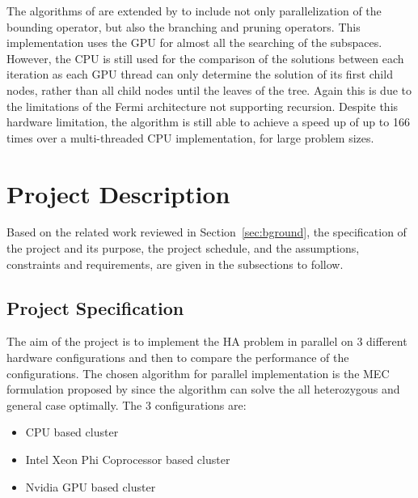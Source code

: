 \documentclass[10pt,twocolumn]{article}
\begin{document}
The algorithms of \cite{melab:2012, chakroun:2012} are extended by \cite{chakroun:2013} to 
include not only parallelization of the bounding operator, but also the branching and pruning operators. This
implementation uses the GPU for almost all the searching of the subspaces. However, the CPU is still used for the
comparison of the solutions between each iteration as each GPU thread can only determine the solution of its 
first child nodes, rather than all child nodes until the leaves of the tree. Again this is due to the limitations 
of the Fermi architecture not supporting recursion. Despite this hardware limitation, the algorithm is still able
to achieve a speed up of up to 166 times over a multi-threaded CPU implementation, for large problem sizes.


\section{Project Description} \label{sec:projdes}

Based on the related work reviewed in Section~\ref{sec:bground}, the specification of the project and its 
purpose, the project schedule, and the assumptions, constraints and requirements, are given in the 
subsections to follow.

\subsection{ Project Specification } \label{sec:projspec}

The aim of the project is to implement the HA problem in parallel on 3 different hardware configurations and 
then to compare the performance of the configurations. The chosen algorithm for parallel implementation is 
the MEC formulation proposed by \cite{chen:2013} since the algorithm can solve the all heterozygous and 
general case optimally. The 3 configurations are:
\begin{itemize}[noitemsep]
    \item{CPU based cluster}
    \item{Intel Xeon Phi Coprocessor based cluster}
    \item{Nvidia GPU based cluster}
\end{itemize}
\end{document}
